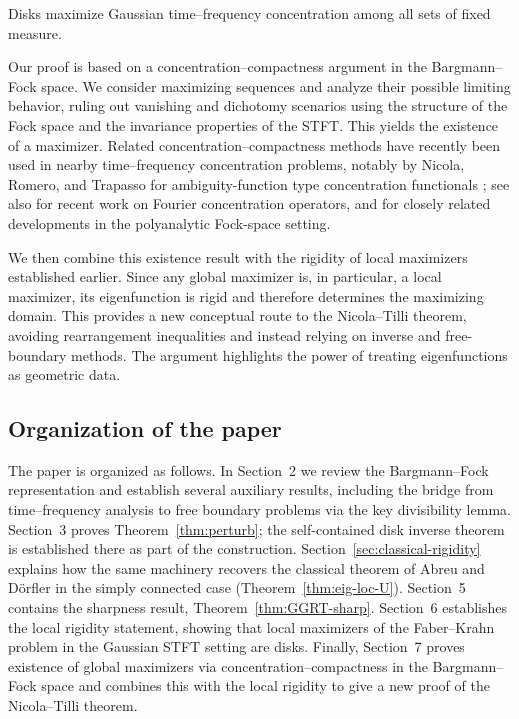 \begin{theorem}
Disks maximize Gaussian time--frequency concentration among all sets of fixed measure.
\end{theorem}

Our proof is based on a concentration--compactness argument in the Bargmann--Fock space. We consider maximizing sequences and analyze their possible limiting behavior, ruling out vanishing and dichotomy scenarios using the structure of the Fock space and the invariance properties of the STFT. This yields the existence of a maximizer. Related concentration--compactness methods have recently been used in nearby time--frequency concentration problems, notably by Nicola, Romero, and Trapasso for ambiguity-function type concentration functionals \cite{Nicola-Romero-Trapasso}; see also \cite{Marceca-Romero-Speckbacher,Samuelsen} for recent work on Fourier concentration operators, and \cite{Fulsche-Hagger} for closely related developments in the polyanalytic Fock-space setting.

We then combine this existence result with the rigidity of local maximizers established earlier. Since any global maximizer is, in particular, a local maximizer, its eigenfunction is rigid and therefore determines the maximizing domain. This provides a new conceptual route to the Nicola--Tilli theorem, avoiding rearrangement inequalities and instead relying on inverse and free-boundary methods. The argument highlights the power of treating eigenfunctions as geometric data.

\subsection{Organization of the paper}

The paper is organized as follows. In Section~2 we review the Bargmann--Fock representation and establish several auxiliary results, including the bridge from time--frequency analysis to free boundary problems via the key divisibility lemma. Section~3 proves Theorem~\ref{thm:perturb}; the self-contained disk inverse theorem is established there as part of the construction. Section~\ref{sec:classical-rigidity} explains how the same machinery recovers the classical theorem of Abreu and D\"orfler in the simply connected case (Theorem~\ref{thm:eig-loc-U}). Section~5 contains the sharpness result, Theorem~\ref{thm:GGRT-sharp}. Section~6 establishes the local rigidity statement, showing that local maximizers of the Faber--Krahn problem in the Gaussian STFT setting are disks. Finally, Section~7 proves existence of global maximizers via concentration--compactness in the Bargmann--Fock space and combines this with the local rigidity to give a new proof of the Nicola--Tilli theorem.


